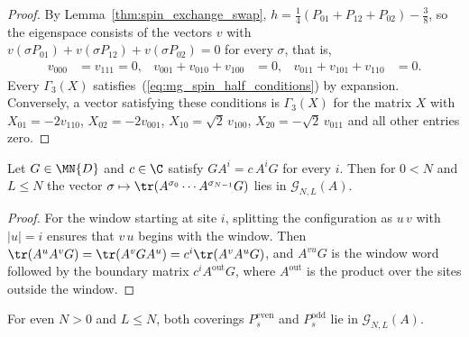 \begin{proof}
    \leanok
    By Lemma~\ref{thm:spin_exchange_swap},
    $h=\tfrac14(P_{01}+P_{12}+P_{02})-\tfrac38$, so the eigenspace consists of
    the vectors $v$ with $v(\sigma P_{01})+v(\sigma P_{12})+v(\sigma P_{02})=0$
    for every $\sigma$, that is,
    \begin{align}
        v_{000} & = v_{111} = 0,
                & v_{001}+v_{010}+v_{100} & = 0,
                & v_{011}+v_{101}+v_{110} & = 0.
        \label{eq:mg_spin_half_conditions}
    \end{align}
    Every $\Gamma_3(X)$ satisfies~(\ref{eq:mg_spin_half_conditions}) by
    expansion. Conversely, a vector satisfying these conditions is
    $\Gamma_3(X)$ for the matrix $X$ with $X_{01}=-2v_{110}$,
    $X_{02}=-2v_{001}$, $X_{10}=\sqrt2\,v_{100}$, $X_{20}=-\sqrt2\,v_{011}$ and
    all other entries zero.
\end{proof}

\begin{lemma}%
    \label{thm:twisted_mpv_chain_ground_space}
    \leanok
    Let $G\in\MN{D}$ and $c\in\C$ satisfy $GA^i=c\,A^iG$ for every $i$. Then
    for $0<N$ and $L\le N$ the vector
    $\sigma\mapsto\tr(A^{\sigma_0}\cdots A^{\sigma_{N-1}}G)$ lies in
    $\mathcal G_{N,L}(A)$.
\end{lemma}

\begin{proof}
    \leanok
    For the window starting at site $i$, splitting the configuration as $u\,v$
    with $|u|=i$ ensures that $v\,u$ begins with the window. Then
    $\tr(A^uA^vG)=\tr(A^vGA^u)=c^{i}\tr(A^vA^uG)$, and $A^{vu}G$ is the window
    word followed by the boundary matrix $c^i A^{\mathrm{out}}G$, where
    $A^{\mathrm{out}}$ is the product over the sites outside the window.
\end{proof}

\begin{lemma}%
    \label{thm:majumdar_ghosh_coverings_chain_ground_space}
    \leanok
    For even $N>0$ and $L\le N$, both coverings $P^{\mathrm{even}}_s$ and
    $P^{\mathrm{odd}}_s$ lie in $\mathcal G_{N,L}(A)$.
\end{lemma}

